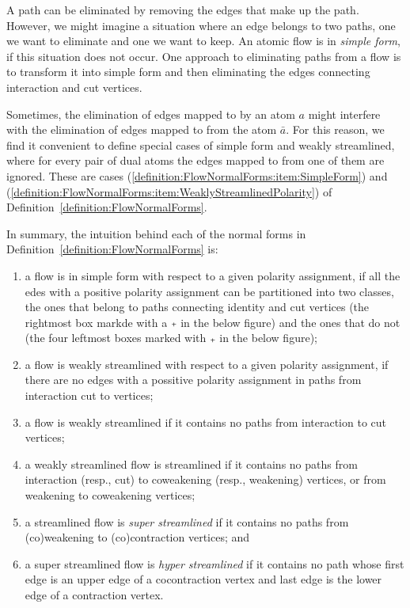 A path can be eliminated by removing the edges that make up the path. However, we might imagine a situation where an edge belongs to two paths, one we want to eliminate and one we want to keep. An atomic flow is in \emph{simple form}, if this situation does not occur. One approach to eliminating paths from a flow is to transform it into simple form and then eliminating the edges connecting interaction and cut vertices.

Sometimes, the elimination of edges mapped to by an atom $a$ might interfere with the elimination of edges mapped to from the atom $\bar a$. For this reason, we find it convenient to define special cases of simple form and weakly streamlined, where for every pair of dual atoms the edges mapped to from one of them are ignored. These are cases (\ref{definition:FlowNormalForms:item:SimpleForm}) and (\ref{definition:FlowNormalForms:item:WeaklyStreamlinedPolarity}) of Definition~\ref{definition:FlowNormalForms}.


In summary, the intuition behind each of the normal forms in Definition~\vref{definition:FlowNormalForms} is:
\begin{enumerate}
\item a flow is in simple form with respect to a given polarity assignment, if all the edes with a positive polarity assignment can be partitioned into two classes, the ones that belong to paths connecting identity and cut vertices (the rightmost box markde with a $\ppl$ in the below figure) and the ones that do not (the four leftmost boxes marked with $\ppl$ in the below figure);
\item a flow is weakly streamlined with respect to a given polarity assignment, if there are no edges with a possitive polarity assignment in paths from interaction cut to vertices;
\item a flow is weakly streamlined if it contains no paths from interaction to cut vertices;
\item a weakly streamlined flow is streamlined if it contains no paths from interaction (resp., cut) to coweakening (resp., weakening) vertices, or from weakening to coweakening vertices;
\item a streamlined flow is \emph{super streamlined} if it contains no paths from (co)weakening to (co)contraction vertices; and
\item a super streamlined flow is \emph{hyper streamlined} if it contains no path whose first edge is an upper edge of a cocontraction vertex and last edge is the lower edge of a contraction vertex.
\end{enumerate}

